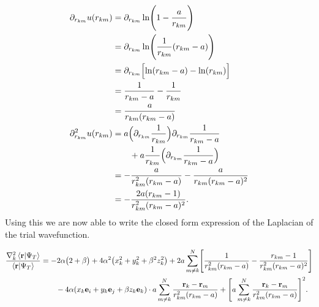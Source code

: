\documentclass[
    a4paper, aps, twocolumn, floatfix, superscriptaddress]{revtex4-1}
\newcommand{\vf}{\mathbf}
\newcommand{\1}{\mathds{1}}
\begin{document}
            \begin{align}
                \partial_{r_{km}}u(r_{km})
                &=
                \partial_{r_{km}}
                \ln\Biggl(
                    1 - \frac{a}{r_{km}}
                \Biggr) \\
                &=
                \partial_{r_{km}}
                \ln\Biggl(
                    \frac{1}{r_{km}}
                    (r_{km} - a)
                \Biggr) \\
                &=
                \partial_{r_{km}}
                \Bigl[
                    \ln(r_{km} - a)
                    - \ln(r_{km})
                \Bigr] \\
                &=
                \frac{1}{r_{km} - a} - \frac{1}{r_{km}} \\
                &=
                \frac{a}{r_{km}(r_{km} - a)} \\
                \partial_{r_{km}}^2u(r_{km})
                &= a\Bigl(
                    \partial_{r_{km}}\frac{1}{r_{km}}
                \Bigr)
                \partial_{r_{km}}\frac{1}{r_{km} - a}
                \nonumber \\
                &\qquad
                + a\frac{1}{r_{km}}
                \Bigl(
                    \partial_{r_{km}}\frac{1}{r_{km} - a}
                \Bigr) \\
                &=
                -\frac{a}{r_{km}^2(r_{km} - a)}
                -\frac{a}{r_{km}(r_{km} - a)^2} \\
                &=
                - \frac{2a(r_{km} - 1)}{r_{km}^2(r_{km} - a)^2}.
            \end{align}
            Using this we are now able to write the closed form expression of
            the Laplacian of the trial wavefunction.
            \begin{widetext}
                \begin{align}
                    \frac{\nabla_k^2\bra{\vf{r}}\ket{\Psi_T}}
                    {\bra{\vf{r}}\ket{\Psi_T}}
                    &=
                    -2\alpha
                    \big(
                        2 + \beta
                    \bigr)
                    + 4\alpha^2
                    \bigl(
                        x_k^2 + y_k^2 + \beta^2z_k^2
                    \bigr)
                    +
                    2a
                    \sum_{m \neq k}^N
                    \Biggl[
                        \frac{1}{r_{km}^2(r_{km} - a)}
                        - \frac{r_{km} - 1}{r_{km}^2(r_{km} - a)^2}
                    \Biggr]
                    \nonumber \\
                    &\qquad
                    -4\alpha(x_k\vf{e}_i + y_k\vf{e}_j + \beta z_k\vf{e}_k)
                    \cdot
                    a\sum_{m \neq k}^N
                    \frac{\vf{r}_k - \vf{r}_m}{r_{km}^2(r_{km} - a)}
                    + \Biggl[
                        a\sum_{m \neq k}^N
                        \frac{\vf{r}_k - \vf{r}_m}{r_{km}^2(r_{km} - a)}
                    \Biggr]^2.
                \end{align}
            \end{widetext}
\end{document}
